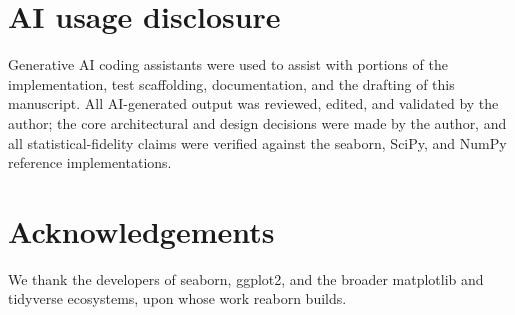 \documentclass[11pt]{article}
\begin{document}
\section{AI usage disclosure}

Generative AI coding assistants were used to assist with portions of the
implementation, test scaffolding, documentation, and the drafting of this manuscript.
All AI-generated output was reviewed, edited, and validated by the author; the core
architectural and design decisions were made by the author, and all
statistical-fidelity claims were verified against the seaborn, SciPy, and NumPy
reference implementations.

\section*{Acknowledgements}

We thank the developers of seaborn, ggplot2, and the broader matplotlib and tidyverse
ecosystems, upon whose work reaborn builds.


\end{document}
